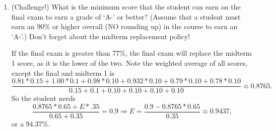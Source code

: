 \documentclass{article}
\newcommand{\answer}[1]{\color{red}#1}
\begin{document}
\begin{enumerate}
\begin{enumerate}
	\item (Challenge!) What is the minimum score that the student can earn on the final exam to earn a grade of `A-' or better?  (Assume that a student must earn an 90\% or higher overall (NO rounding up) in the course to earn an `A-'.) Don't forget about the midterm replacement policy!
	
	{\answer{If the final exam is greater than 77\%, the final exam will replace the midterm 1 score, as it is the lower of the two. Note the weighted average of all scores, except the final and midterm 1 is
	$$\frac{0.81*0.15 + 1.00*0.1 + 0.98*0.10 + 0.932*0.10 + 0.79*0.10+ 0.78*0.10}{0.15+0.1+0.10+0.10+0.10+0.10} \approx 0.8765.$$
	So the student needs 
	$$\frac{0.8765*0.65 + E*.35}{0.65+0.35} = 0.9 \Rightarrow E=\frac{0.9-0.8765*0.65}{0.35} \approx 0.9437,$$ or a 94.37\%.}}
	
	\end{enumerate}

\vfill

\end{enumerate}

\vfill
\end{document}

